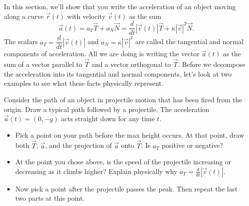 In this section, we'll show that you write the acceleration of an object moving along a curve $\vec r(t)$ with velocity $\vec v(t)$ as the sum
$$\vec a(t) = a_T\vec T+a_N\vec N=\frac{d}{dt}|\vec v(t)| \vec T + \kappa |\vec v|^2 \vec N.$$
The scalars $a_T=\dfrac{d}{dt}|\vec v(t)|$ and $a_N=\kappa |\vec v|^2$ 
are called the tangential and normal components of acceleration.  All we are doing is writing the vector $\vec a(t)$ as the sum of a vector parallel to $\vec T$ and a vector orthogonal to $\vec T$. Before we decompose the acceleration into its tangential and normal components, let's look at two examples to see what these facts physically represent.

\begin{problem}
%
 Consider the path of an object in projectile motion that has been fired from the origin. Draw a typical path followed by a projectile.  The acceleration $\vec a(t)=(0,-g)$ acts straight down for any time $t$.  
\begin{itemize}
 \item Pick a point on your path before the max height occurs. At that point, draw both $\vec T$, $\vec a$, and the projection of $\vec a$ onto $\vec T$.  Is $a_T$ positive or negative? 
 \item At the point you chose above, is the speed of the projectile increasing or decreasing as it climbs higher? Explain physically why $a_T = \frac{d}{dt}|\vec v(t)|$.
 \item Now pick a point after the projectile passes the peak.  Then repeat the last two parts at this point.
\end{itemize}
\end{problem}

